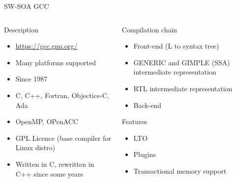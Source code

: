 %
\begin{Frame}{SW-SOA GCC}
  \begin{columns}[t]
    \begin{column}{\BW} %
      \begin{block}{Description}
        \begin{itemize}
        \item \href{https://gcc.gnu.org/}{https://gcc.gnu.org/}
        \item Many platforms supported
        \item Since 1987
        \item C, C++, Fortran, Objectice-C, Ada
        \item OpenMP, OPenACC
        \item GPL Licence (base compiler for Linux distro)
        \item Written in C, rewritten in C++ since some years
        \end{itemize}
      \end{block}
    \end{column}

    \begin{column}{6cm} %
      \begin{block}{Compilation chain}
        \begin{itemize}
        \item Front-end (L to syntax tree)
        \item GENERIC and GIMPLE (SSA) intermediate representation
        \item RTL intermediate representation
        \item Back-end
        \end{itemize}
      \end{block}
        \begin{block}{Features}
          \begin{itemize}
          \item LTO
          \item Plugins
          \item Transactional memory support
          \end{itemize}
        \end{block}
    \end{column}
  \end{columns}
\end{Frame}

